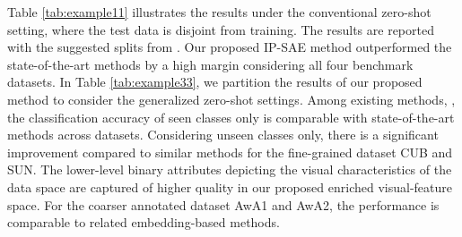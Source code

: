\documentclass{article}
\begin{document}
Table \ref{tab:example11} illustrates the results under the conventional zero-shot setting, where the test data is disjoint from training. The results are reported with the suggested splits from \cite{b56}. Our proposed IP-SAE method outperformed the state-of-the-art methods by a high margin considering all four benchmark datasets.  In Table \ref{tab:example33}, we partition the results of our proposed method to consider the generalized zero-shot settings. Among existing methods, \cite{b56}, the classification accuracy of seen classes only is comparable with state-of-the-art methods across datasets. Considering unseen classes only, there is a significant improvement compared to similar methods for the fine-grained dataset CUB and SUN. The lower-level binary attributes depicting the visual characteristics of the data space are captured of higher quality in our proposed enriched visual-feature space. For the coarser annotated dataset AwA1 and AwA2, the performance is comparable to related embedding-based methods.
\end{document}
